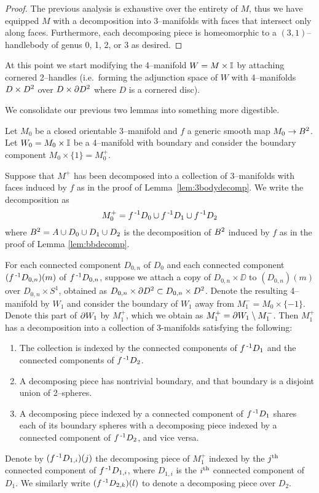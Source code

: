 \begin{proof}
	The previous analysis is exhaustive over the entirety of $M$, thus we have equipped $M$ with a decomposition into 3--manifolds with faces that intersect only along faces.
	Furthermore, each decomposing piece is homeomorphic to a $(3,1)$--handlebody of genus 0, 1, 2, or 3 as desired.
\end{proof}

At this point we start modifying the 4--manifold $W=M \times \mathbb{I}$ by attaching cornered 2--handles (i.e.\ forming the adjunction space of $W$ with 4--manifolds $D\times D^2$ over $D\times\partial D^2$ where $D$ is a cornered disc).

We consolidate our previous two lemmas into something more digestible.

\begin{lem}
	\label{lem:3bodyredecomp}
	Let $M_0$ be a closed orientable 3--manifold and $f$ a generic smooth map $M_0\to B^2$.
	Let $W_0=M_0\times\mathbb{I}$ be a 4--manifold with boundary and consider the boundary component $M_0\times\{1\}=M_0^+$.
	
	Suppose that $M^+$ has been decomposed into a collection of 3--manifolds with faces induced by $f$ as in the proof of Lemma~\ref{lem:3bodydecomp}.
	We write the decomposition as
	\[
	M_0^+ = f^{\,\text{-}1} D_0\cup f^{\,\text{-}1} D_1\cup f^{\,\text{-}1} D_2
	\]
	where $B^2=A\cup D_0\cup D_1\cup D_2$ is the decomposition of $B^2$ induced by $f$ as in the proof of Lemma \ref{lem:bbdecomp}.
	
	For each connected component $D_{0,n}$ of $D_0$ and each connected component $(f^{\,\text{-}1} D_{0,n})(m)$ of $f^{\,\text{-}1} D_{0,n}$, suppose we attach a copy of $D_{0,n}\times\DD$ to $(D_{0,n})(m)$ over $D_{0,n}\times S^1$, obtained as $D_{0,n}\times \partial D^2\subset D_{0,n}\times D^2$.
	Denote the resulting 4--manifold by $W_1$ and consider the boundary of $W_1$ away from $M_1^-=M_0\times\{-1\}$.
	Denote this part of $\partial W_1$ by $M_1^+$, which we obtain as $M_1^+=\partial W_1\setminus M_1^-$.
	Then $M_1^+$ has a decomposition into a collection of 3-manifolds satisfying the following:
	\begin{enumerate}
		\item
		The collection is indexed by the connected components of $f^{\,\text{-}1} D_1$ and the connected components of $f^{\,\text{-}1} D_2$.
		
		\item
		A decomposing piece has nontrivial boundary, and that boundary is a disjoint union of 2--spheres.
		
		\item
		A decomposing piece indexed by a connected component of $f^{\,\text{-}1} D_1$ shares each of its boundary spheres with a decomposing piece indexed by a connected component of $f^{\,\text{-}1} D_2$, and vice versa.
	\end{enumerate}
	Denote by $(f^{\,\text{-}1} D_{1,i})(j)$ the decomposing piece of $M_1^+$ indexed by the $j^{\text{th}}$ connected component of $f^{\,\text{-}1} D_{1,i}$, where $D_{1,i}$ is the $i^{\text{th}}$ connected component of $D_1$.
	We similarly write $(f^{\,\text{-}1} D_{2,k})(l)$ to denote a decomposing piece over $D_2$.
\end{lem}

